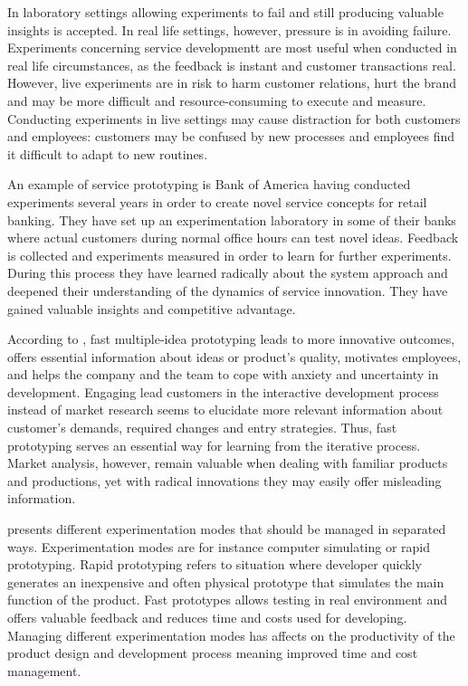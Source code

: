 In laboratory settings allowing experiments to fail and still producing valuable insights is accepted. In real life settings, however, pressure is in avoiding failure. Experiments concerning service developmentt are most useful when conducted in real life circumstances, as the feedback is instant and customer transactions real. However, live experiments are in risk to harm customer relations, hurt the brand and may be more difficult and resource-consuming to execute and measure. Conducting experiments in live settings may cause distraction for both customers and employees: customers may be confused by new processes and employees find it difficult to adapt to new routines. \citep{thomke2003r}

An example of service prototyping is Bank of America having conducted experiments several years in order to create novel service concepts for retail banking. They have set up an experimentation laboratory in some of their banks where actual customers during normal office hours can test novel ideas. Feedback is collected and experiments measured in order to learn for further experiments. During this process they have learned radically about the system approach and deepened their understanding of the dynamics of service innovation. They have gained valuable insights and competitive advantage. \citep{thomke2003r}

According to \citet{quinn1985managing}, fast multiple-idea prototyping leads to more innovative outcomes, offers essential information about ideas or product's quality, motivates employees, and helps the company and the team to cope with anxiety and uncertainty in development. Engaging lead customers in the interactive development process instead of market research seems to elucidate more relevant information about customer's demands, required changes and entry strategies. Thus, fast prototyping serves an essential way for learning from the iterative process. Market analysis, however, remain valuable when dealing with familiar products and productions, yet with radical innovations they may easily offer misleading information. \citep{quinn1985managing}

\citet{thomke1998managing} presents different experimentation modes that should be managed in separated ways. Experimentation modes are for instance computer simulating or rapid prototyping. Rapid prototyping refers to situation where developer quickly generates an inexpensive and often physical prototype that simulates the main function of the product. Fast prototypes allows testing in real environment and offers valuable feedback and reduces time and costs used for developing. Managing different experimentation modes has affects on the productivity of the product design and development process meaning improved time and cost management.

